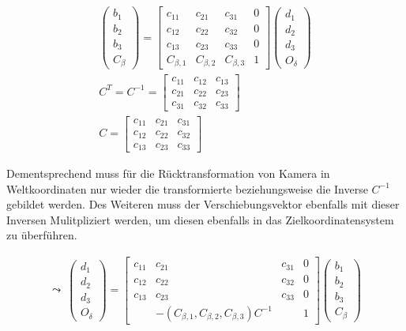 	\begin{gather}
	\begin{pmatrix}
	b_1\\
	b_2\\
	b_3\\
	C_\beta
	\end{pmatrix} = 
	\begin{bmatrix}
	c_{11} & c_{21} & c_{31} & 0\\
	c_{12} & c_{22} & c_{32} & 0\\
	c_{13} & c_{23} & c_{33} & 0\\
	C_{\beta,1} & C_{\beta,2} & C_{\beta,3} & 1
	\end{bmatrix}
	\begin{pmatrix}
	d_1\\
	d_2\\
	d_3\\
	O_\delta
	\end{pmatrix}\\
	C^T = C^{-1}= \begin{bmatrix}
	c_{11} & c_{12} & c_{13} \\
	c_{21} & c_{22} & c_{23} \\
	c_{31} & c_{32} & c_{33} 
	\end{bmatrix}\\
	C = \begin{bmatrix}
	c_{11} & c_{21} & c_{31} \\
	c_{12} & c_{22} & c_{32} \\
	c_{13} & c_{23} & c_{33} 
	\end{bmatrix}
	\end{gather}

Dementsprechend muss für die Rücktransformation von Kamera in Weltkoordinaten nur wieder die transformierte beziehungsweise die Inverse \ensuremath{C^{-1}} gebildet werden. Des Weiteren muss der Verschiebungsvektor ebenfalls mit dieser Inversen Mulitpliziert werden, um diesen ebenfalls in das Zielkoordinatensystem zu überführen.
	
	
	\begin{gather}
	\leadsto \: \begin{pmatrix}
	d_1\\
	d_2\\
	d_3\\
	O_\delta
	\end{pmatrix} = 
	\begin{bmatrix}
	c_{11} & c_{21} & c_{31} & 0\\
	c_{12} & c_{22} & c_{32} & 0\\
	c_{13} & c_{23} & c_{33} & 0\\
	&-(	C_{\beta,1}, C_{\beta,2}, C_{\beta,3})C^{-1}& & 1
	\end{bmatrix}
	\begin{pmatrix}
	b_1\\
	b_2\\
	b_3\\
	C_\beta
	\end{pmatrix}
	\end{gather}
	
